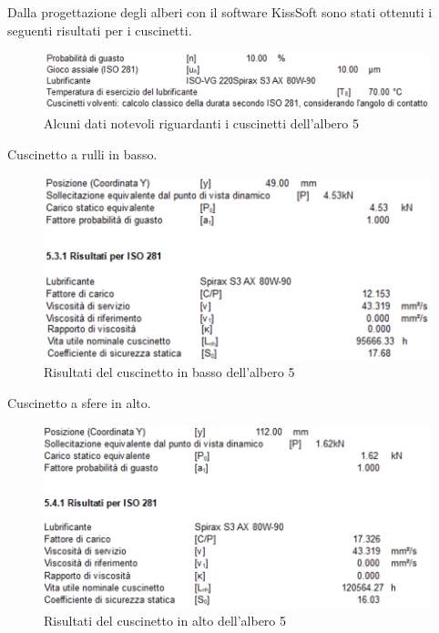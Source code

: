 Dalla progettazione degli alberi con il software KissSoft sono stati ottenuti i seguenti risultati per i cuscinetti.
\begin{figure}[h]
    \centering
    \includegraphics[scale=0.6]{Immagini/DettagliCuscinettiAlbero5.png}
    \caption{Alcuni dati notevoli riguardanti i cuscinetti dell'albero 5}
    \label{fig:DettagliCuscinettiAlbero5}
\end{figure}

Cuscinetto a rulli in basso.
\begin{figure}[h]
    \centering
        \includegraphics[scale=0.6]{Immagini/RisultatiCuscinettoBassoAlbero5.png}
    \caption{Risultati del cuscinetto in basso dell'albero 5}
    \label{fig:RisultatiCuscinettoBassoAlbero5}
\end{figure}
\newpage
Cuscinetto a sfere in alto.
\begin{figure}[h]
    \centering
    \includegraphics[scale=0.6]{Immagini/RisultatiCuscinettoAltoAlbero5.png}
    \caption{Risultati del cuscinetto in alto dell'albero 5}
    \label{fig:RisultatiCuscinettoAltoAlbero5}
\end{figure}

